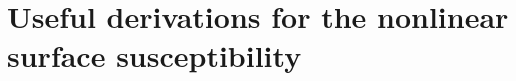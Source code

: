 \chapter{Useful derivations for the nonlinear surface susceptibility}
\label{app:chi2deriv}
\partialtoc




\stopcontents[chapters]

